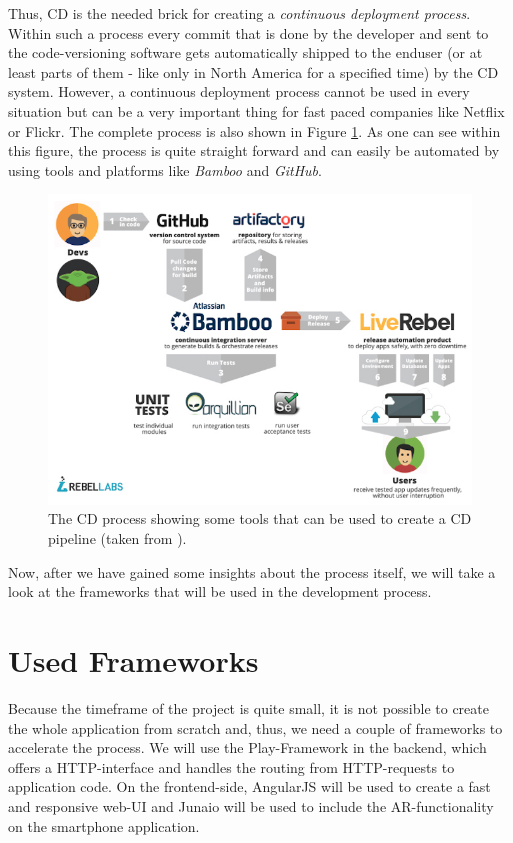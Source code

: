 Thus, \ac{CD} is the needed brick for creating a \emph{continuous deployment process}. Within such a process every commit that is done by the developer and sent to the code-versioning software gets automatically shipped to the enduser (or at least parts of them - like only in North America for a specified time) by the \ac{CD} system. However, a continuous deployment process cannot be used in every situation but can be a very important thing for fast paced companies like Netflix or Flickr. The complete process is also shown in Figure \ref{hip:cd}. As one can see within this figure, the process is quite straight forward and can easily be automated by using tools and platforms like \emph{Bamboo} and \emph{GitHub}.

\begin{figure}[th]
\centerline{\includegraphics[width=1\textwidth]{gfx/continuous-delivery}}
\caption{The \ac{CD} process showing some tools that can be used to create a \ac{CD} pipeline (taken from \cite{Wattson:2013aa}).}
\label{hip:cd}
\end{figure}

Now, after we have gained some insights about the process itself, we will take a look at the frameworks that will be used in the development process.

\section{Used Frameworks}
Because the timeframe of the project is quite small, it is not possible to create the whole application from scratch and, thus, we need a couple of frameworks to accelerate the process. We will use the Play-Framework in the backend, which offers a \ac{HTTP}-interface and handles the routing from \ac{HTTP}-requests to application code. On the frontend-side, AngularJS will be used to create a fast and responsive web-\ac{UI} and Junaio will be used to include the \ac{AR}-functionality on the smartphone application.

